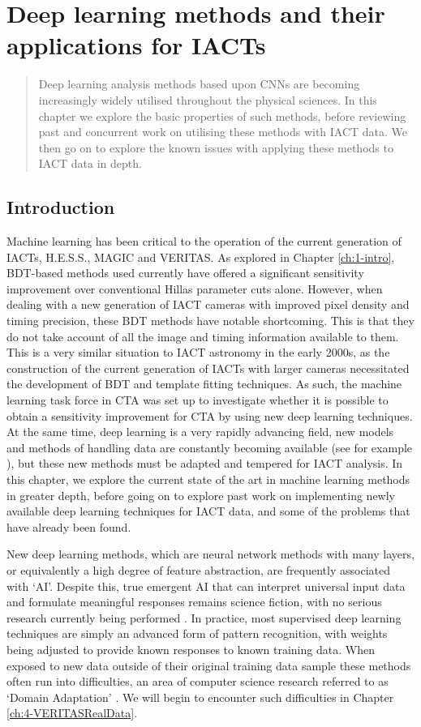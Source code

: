 \chapter{\label{ch:2-CNNs}Deep learning methods and their applications for IACTs}
\minitoc
\begin{abstract}
    Deep learning analysis methods based upon CNNs are becoming increasingly widely utilised throughout the physical sciences. In this chapter we explore the basic properties of such methods, before reviewing past and concurrent work on utilising these methods with IACT data. We then go on to explore the known issues with applying these methods to IACT data in depth.
\end{abstract}

\section{Introduction}

Machine learning has been critical to the operation of the current generation of IACTs, H.E.S.S., MAGIC and VERITAS. As explored in Chapter \ref{ch:1-intro}, BDT-based methods used currently have offered a significant sensitivity improvement over conventional Hillas parameter cuts alone. However, when dealing with a new generation of IACT cameras with improved pixel density and timing precision, these BDT methods have notable shortcoming. This is that they do not take account of all the image and timing information available to them. This is a very similar situation to IACT astronomy in the early 2000s, as the construction of the current generation of IACTs with larger cameras necessitated the development of BDT and template fitting techniques. As such, the machine learning task force in CTA was set up to investigate whether it is possible to obtain a sensitivity improvement for CTA by using new deep learning techniques. At the same time, deep learning is a very rapidly advancing field, new models and methods of handling data are constantly becoming available (see for example \cite{adithesis} \cite{chebnet}), but these new methods must be adapted and tempered for IACT analysis. In this chapter, we explore the current state of the art in machine learning methods in greater depth, before going on to explore past work on implementing newly available deep learning techniques for IACT data, and some of the problems that have already been found. 

New deep learning methods, which are neural network methods with many layers, or equivalently a high degree of feature abstraction, are frequently associated with `AI'. Despite this, true emergent AI that can interpret universal input data and formulate meaningful responses remains science fiction, with no serious research currently being performed \cite{emergent}. In practice, most supervised deep learning techniques are simply an advanced form of pattern recognition, with weights being adjusted to provide known responses to known training data. When exposed to new data outside of their original training data sample these methods often run into difficulties, an area of computer science research referred to as `Domain Adaptation' \cite{wilson}. We will begin to encounter such difficulties in Chapter \ref{ch:4-VERITASRealData}.

